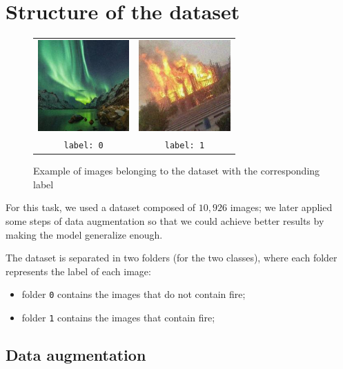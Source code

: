 \documentclass[11pt, journal]{IEEEtran}
\newcommand{\nl}{

\medskip

}
\newcommand{\nl}{

\medskip

}
\begin{document}
\section{Structure of the dataset}

\begin{figure}
    \label{dataset_example}
    \centering
    \begin{tabular}{c c}
        \includegraphics[width = 3.5cm]{imgs/no_fire.jpg} & \includegraphics[width = 3.5cm]{imgs/fire.jpg}
        \\
        \texttt{label: 0} & \texttt{label: 1}
    \end{tabular}
    \caption{Example of images belonging to the dataset with the corresponding label}
\end{figure}

For this task, we used a dataset composed of $10,926$ images; we later applied some steps of data augmentation so that we could achieve better results by making the model generalize enough.
\nl
The dataset is separated in two folders (for the two classes), where each folder represents the label of each image:
\begin{itemize}
    \item folder \verb|0| contains the images that do not contain fire;
    \item folder \verb|1| contains the images that contain fire;
\end{itemize}

\subsection{Data augmentation}
\end{document}
